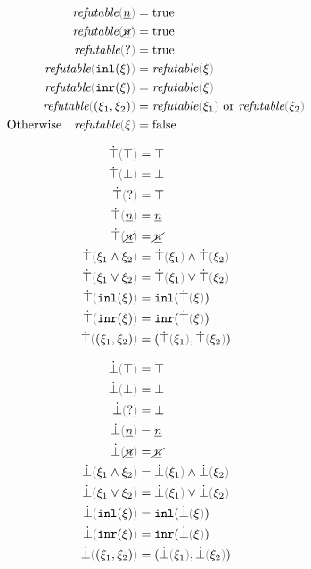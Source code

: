 \judgboxa{\frefutable{\xi}}{}
\begin{subequations}\label{defn:xi-refutable}
\begin{align}
    \frefutable{\cnum{n}} &= \true \\
    \frefutable{\cnotnum{n}} &= \true \\
    \frefutable{\cunknown} &= \true \\
    \frefutable{\cinl{\xi}} &= \frefutable{\xi} \\
    \frefutable{\cinr{\xi}} &= \frefutable{\xi} \\
    \frefutable{\cpair{\xi_1}{\xi_2}} &= \frefutable{\xi_1} \text{ or } \frefutable{\xi_2} \\
  \text{Otherwise}\quad \frefutable{\xi} &= \false 
\end{align}
\end{subequations}


\begin{subequations}\label{defn:truify}
\begin{align}
  \ctruify{\ctruth} &= \ctruth \\
  \ctruify{\cfalsity} &= \cfalsity \\
  \ctruify{\cunknown} &= \ctruth \\
  \ctruify{\cnum{n}} &= \cnum{n} \\
  \ctruify{\cnotnum{n}} &= \cnotnum{n} \\
  \ctruify{\cand{\xi_1}{\xi_2}} &= \cand{\ctruify{\xi_1}}{\ctruify{\xi_2}} \\
  \ctruify{\cor{\xi_1}{\xi_2}} &= \cor{\ctruify{\xi_1}}{\ctruify{\xi_2}} \\
  \ctruify{\cinl{\xi}} &= \cinl{\ctruify{\xi}} \\
  \ctruify{\cinr{\xi}} &= \cinr{\ctruify{\xi}} \\
  \ctruify{\cpair{\xi_1}{\xi_2}} &= \cpair{\ctruify{\xi_1}}{\ctruify{\xi_2}}
\end{align}
\end{subequations}

\begin{subequations}\label{defn:falsify}
\begin{align}
  \cfalsify{\ctruth} &= \ctruth \\
  \cfalsify{\cfalsity} &= \cfalsity \\
  \cfalsify{\cunknown} &= \cfalsity \\
  \cfalsify{\cnum{n}} &= \cnum{n} \\
  \cfalsify{\cnotnum{n}} &= \cnotnum{n} \\
  \cfalsify{\cand{\xi_1}{\xi_2}} &= \cand{\cfalsify{\xi_1}}{\cfalsify{\xi_2}} \\
  \cfalsify{\cor{\xi_1}{\xi_2}} &= \cor{\cfalsify{\xi_1}}{\cfalsify{\xi_2}} \\
  \cfalsify{\cinl{\xi}} &= \cinl{\cfalsify{\xi}} \\
  \cfalsify{\cinr{\xi}} &= \cinr{\cfalsify{\xi}} \\
  \cfalsify{\cpair{\xi_1}{\xi_2}} &= \cpair{\cfalsify{\xi_1}}{\cfalsify{\xi_2}}
\end{align}
\end{subequations}

